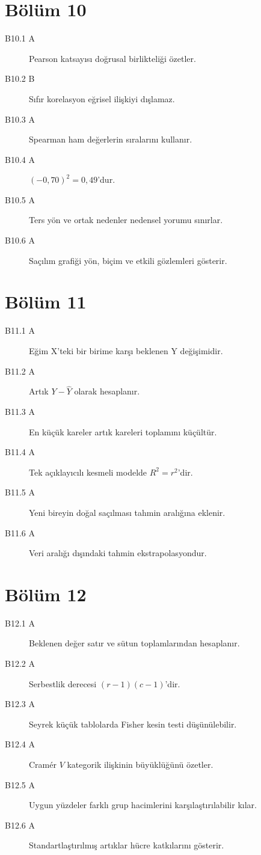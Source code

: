 \section*{Bölüm 10}
\begin{description}
\item[B10.1 A] Pearson katsayısı doğrusal birlikteliği özetler.
\item[B10.2 B] Sıfır korelasyon eğrisel ilişkiyi dışlamaz.
\item[B10.3 A] Spearman ham değerlerin sıralarını kullanır.
\item[B10.4 A] $(-0{,}70)^2=0{,}49$'dur.
\item[B10.5 A] Ters yön ve ortak nedenler nedensel yorumu sınırlar.
\item[B10.6 A] Saçılım grafiği yön, biçim ve etkili gözlemleri gösterir.
\end{description}

\section*{Bölüm 11}
\begin{description}
\item[B11.1 A] Eğim X'teki bir birime karşı beklenen Y değişimidir.
\item[B11.2 A] Artık $Y-\widehat Y$ olarak hesaplanır.
\item[B11.3 A] En küçük kareler artık kareleri toplamını küçültür.
\item[B11.4 A] Tek açıklayıcılı kesmeli modelde $R^2=r^2$'dir.
\item[B11.5 A] Yeni bireyin doğal saçılması tahmin aralığına eklenir.
\item[B11.6 A] Veri aralığı dışındaki tahmin ekstrapolasyondur.
\end{description}

\section*{Bölüm 12}
\begin{description}
\item[B12.1 A] Beklenen değer satır ve sütun toplamlarından hesaplanır.
\item[B12.2 A] Serbestlik derecesi $(r-1)(c-1)$'dir.
\item[B12.3 A] Seyrek küçük tablolarda Fisher kesin testi düşünülebilir.
\item[B12.4 A] Cramér $V$ kategorik ilişkinin büyüklüğünü özetler.
\item[B12.5 A] Uygun yüzdeler farklı grup hacimlerini karşılaştırılabilir kılar.
\item[B12.6 A] Standartlaştırılmış artıklar hücre katkılarını gösterir.
\end{description}

